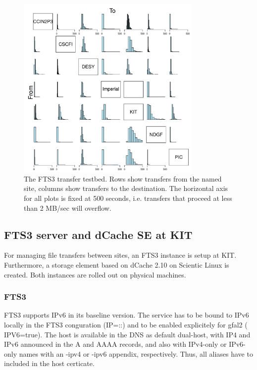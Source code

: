 \begin{figure}[h]
 \centering
   \includegraphics[width=0.8\textwidth]{fts3-mesh.pdf}
       \caption{The FTS3 transfer testbed. Rows show transfers from the named site, columns show transfers to the destination. The horizontal axis for all plots is fixed at 500 seconds, i.e. transfers that proceed at less than 2 MB/sec will overflow.}
 \label{fig:fts3-mesh}
\end{figure}


\subsection{FTS3 server and dCache SE at KIT}
For managing file transfers between sites, an FTS3 instance is setup at KIT. Furthermore, a storage element based on dCache 2.10 on Scientic Linux is created. Both instances are rolled out on physical machines.

\subsubsection{FTS3}
FTS3 supports IPv6 in its baseline version. The service has to be bound to IPv6 locally in the FTS3 conguration (IP=::) and to be enabled explicitely for gfal2 ( IPV6=true). The host is available in the DNS as default dual-host, with IP4 and IPv6 announced in the A and AAAA records, and also with IPv4-only or IPv6-only names with an -ipv4 or -ipv6 appendix, respectively. Thus, all aliases have to included in the host certicate.

